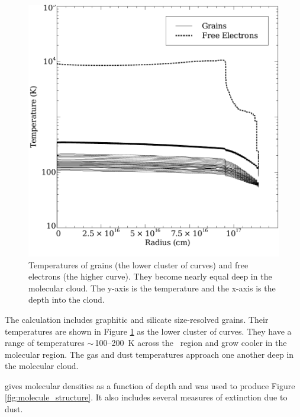 \documentclass[12pt,twoside]{article}
\begin{document}
\begin{figure}
\begin{center}
\includegraphics[clip=on,width=0.8\columnwidth,height=0.8\textheight,keepaspectratio]{grain_temperature}
\end{center}
\caption{Temperatures of grains (the lower
cluster of curves) and free electrons
(the higher curve).  They become nearly equal deep in the molecular cloud.
The y-axis is the temperature and the x-axis is the depth into the cloud.}
\label{fig:grain_temperature}
\end{figure}

The calculation includes graphitic and silicate size-resolved grains.
Their temperatures are shown in Figure \ref{fig:grain_temperature}
as the lower cluster of curves.
They have a range of temperatures
$\sim\,$100--200~K across the \hplus\
region and grow cooler in the molecular region.
The gas and dust
temperatures approach one another deep in the molecular cloud.

 gives molecular
densities as a function of depth
and was used to produce Figure \ref{fig:molecule_structure}.
It also includes several
measures of extinction due to dust.
\end{document}
